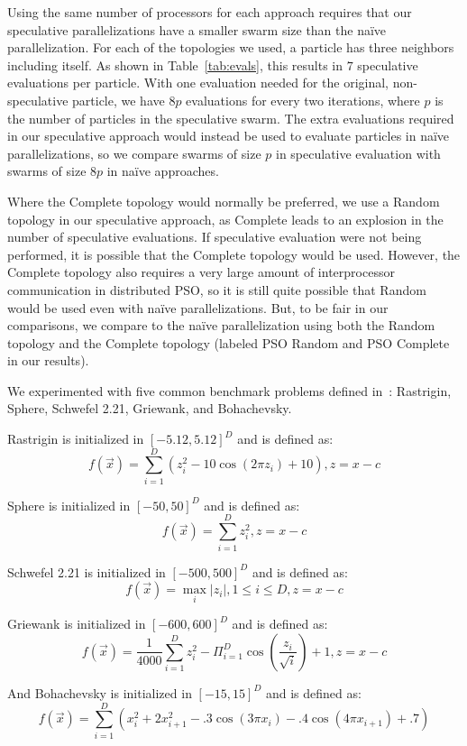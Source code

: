 \documentclass[smallcondensed]{svjour3}
\begin{document}
Using the same number of processors for each approach requires that our
speculative parallelizations have a smaller swarm size than the na\"ive
parallelization.  For each of the topologies we used, a particle has three
neighbors including itself.  As shown in Table~\ref{tab:evals}, this results in
$7$ speculative evaluations per particle.  With one evaluation needed for the
original, non-speculative particle, we have $8p$ evaluations for every two
iterations, where $p$ is the number of particles in the speculative swarm.  The
extra evaluations required in our speculative approach would instead be used to
evaluate particles in na\"ive parallelizations, so we compare swarms of size
$p$ in speculative evaluation with swarms of size $8p$ in na\"ive approaches.

Where the Complete topology would normally be preferred, we use a Random
topology in our speculative approach, as Complete leads to an explosion in the
number of speculative evaluations.  If speculative evaluation were not being
performed, it is possible that the Complete topology would be used.  However,
the Complete topology also requires a very large amount of interprocessor
communication in distributed PSO, so it is still quite possible that Random
would be used even with na\"ive parallelizations.  But, to be fair in our
comparisons, we compare to the na\"ive parallelization using both the Random
topology and the Complete topology (labeled PSO Random and PSO Complete in our
results).  

We experimented with five common benchmark problems defined
in~\citep{herrera-2010-test-suite}: Rastrigin, Sphere, Schwefel 2.21, Griewank,
and Bohachevsky.  

Rastrigin is initialized in $[-5.12,5.12]^D$ and is defined as:
\[f(\Vec{x}) = \sum_{i=1}^D\left(z_i^2 - 10\cos\left(2\pi z_i\right) +
10\right), z=x-c\]

Sphere is initialized in $[-50,50]^D$ and is defined as:
\[f(\Vec{x}) = \sum_{i=1}^D z_i^2, z=x-c\]

Schwefel 2.21 is initialized in $[-500,500]^D$ and is defined as:
\[f(\Vec{x}) = \max_i{|z_i|, 1 \leq i \leq D}, z=x-c\]

Griewank is initialized in $[-600,600]^D$ and is defined as:
\[f(\Vec{x}) = \frac{1}{4000}\sum_{i=1}^D z_i^2 - \Pi_{i=1}^D
\cos\left(\frac{z_i}{\sqrt{i}} \right) + 1, z=x-c\]

And Bohachevsky is initialized in $[-15,15]^D$ and is defined as:
\[f(\Vec{x}) = \sum_{i=1}^D(x_i^2+2x_{i+1}^2-.3\cos(3\pi x_i)-.4\cos(4\pi
x_{i+1})+.7)\]
\end{document}
